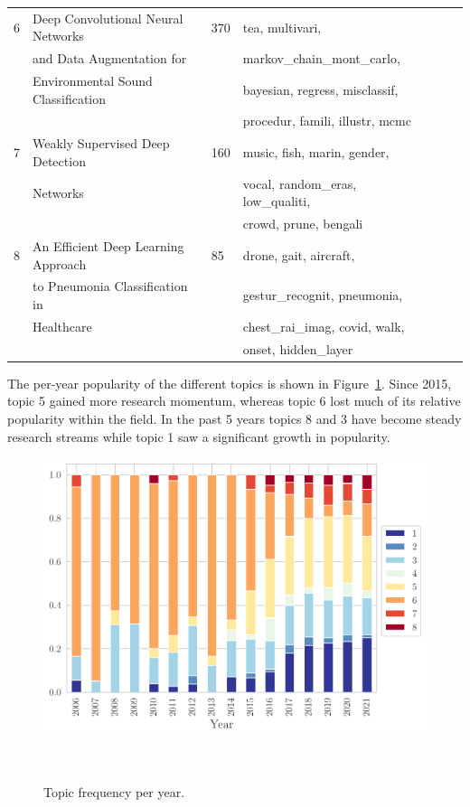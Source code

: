 \documentclass[parskip=full]{scrartcl}
\begin{document}
\begin{table}[ht]
\begin{center}
\begin{tabular*}{\textwidth}{@{\extracolsep{\fill}}lllllll@{\extracolsep{\fill}}}
        6 & Deep Convolutional Neural Networks & 370 & tea, multivari, \\
          & and Data Augmentation for && markov\_chain\_mont\_carlo, \\
          & Environmental Sound Classification && bayesian, regress, misclassif, \\
        \vspace{.2cm}  &&& procedur, famili, illustr, mcmc \\
        
        7 & Weakly Supervised Deep Detection & 160 & music, fish, marin, gender, \\
          & Networks && vocal, random\_eras, low\_qualiti, \\
        \vspace{.2cm}  &&& crowd, prune, bengali \\
        
        8 & An Efficient Deep Learning Approach & 85 & drone, gait, aircraft, \\      
          & to Pneumonia Classification in && gestur\_recognit, pneumonia, \\
          & Healthcare && chest\_rai\_imag, covid, walk, \\
          &&& onset, hidden\_layer \\
        \bottomrule
    \end{tabular*}
    \end{center}
\end{table}

The per-year popularity of the different topics is shown in
Figure~\ref{fig:topics_per_year}. Since 2015, topic 5 gained more research
momentum, whereas topic 6 lost much of its relative popularity within the
field. In the past 5 years topics 8 and 3 have become steady research streams
while topic 1 saw a significant growth in popularity. 

\begin{figure}[H]
	\centering
    \includegraphics[width=\linewidth]{../analysis/topics_per_year}
    \caption{Topic frequency per year.
    }~\label{fig:topics_per_year}
\end{figure}
\end{document}
